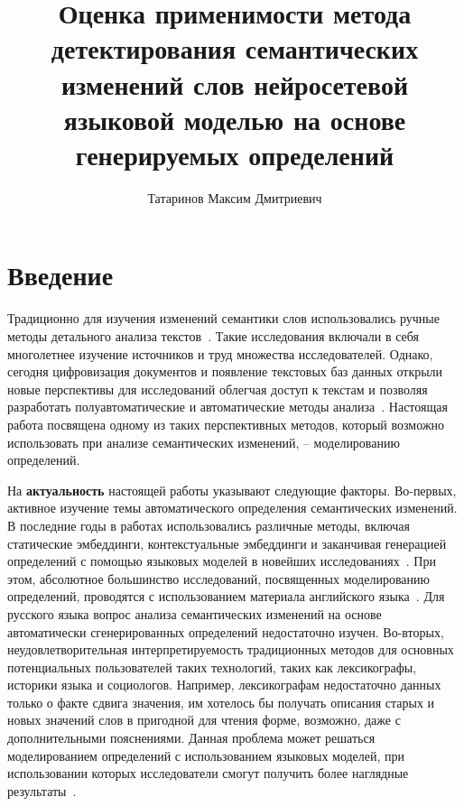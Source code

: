 \documentclass[LI,VKR]{HSEUniversity}
\title{Оценка применимости метода детектирования семантических изменений слов нейросетевой
языковой моделью на основе генерируемых определений}
\author{Татаринов Максим Дмитриевич}
\begin{document}
\maketitle

\chapter*{Введение}

Традиционно для изучения изменений семантики слов использовались ручные методы детального
анализа текстов~\cite{VinogradovWordHistory, TwoCenturies}.
Такие исследования включали в себя многолетнее изучение источников и труд множества исследователей.
Однако, сегодня цифровизация документов и появление текстовых
баз данных открыли новые перспективы для исследований
облегчая доступ к текстам и позволяя разработать полуавтоматические и
автоматические методы анализа~\cite{TahmasebiComputationalApproachesToSemanticChange}.
Настоящая работа посвящена одному из таких перспективных методов,
который возможно использовать при анализе семантических изменений,
– моделированию определений.

На \textbf{актуальность} настоящей работы указывают следующие факторы.
Во-первых, активное изучение темы автоматического определения семантических изменений.
В последние годы в работах использовались различные методы, включая статические эмбеддинги,
контекстуальные эмбеддинги и заканчивая генерацией определений с помощью языковых моделей
в новейших исследованиях~\cite{kutuzov-etal-2018-diachronic,rodina2020elmo,DefinitionGenerationMainArticle}.
При этом, абсолютное большинство исследований, посвященных моделированию определений,
проводятся с использованием материала английского языка~\cite{DefinitionModelingReviewAndDatasetAnalysis}.
Для русского языка вопрос анализа семантических изменений на основе автоматически
сгенерированных определений недостаточно изучен.
Во-вторых, неудовлетворительная интерпретируемость традиционных методов для основных потенциальных
пользователей таких технологий, таких как лексикографы, историки языка и социологов.
Например, лексикографам недостаточно данных только о факте сдвига значения, им хотелось бы
получать описания старых и новых значений слов в пригодной для чтения форме, возможно,
даже с дополнительными пояснениями.
Данная проблема может решаться моделированием определений с использованием языковых
моделей, при использовании которых исследователи смогут получить более наглядные
результаты~\cite{DefinitionGenerationMainArticle}.
\end{document}
